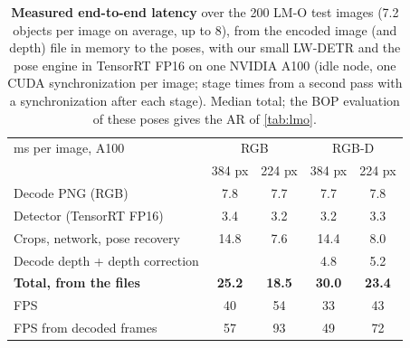\begin{table}[t]
  \centering
  \setlength{\tabcolsep}{3pt}
  \small
  \begin{tabular}{lcccc}
    \toprule
    ms per image, A100 & \multicolumn{2}{c}{RGB} & \multicolumn{2}{c}{RGB-D} \\
    & 384 px & 224 px & 384 px & 224 px \\
    \midrule
    Decode PNG (RGB) & 7.8 & 7.7 & 7.7 & 7.8 \\
    Detector (TensorRT FP16) & 3.4 & 3.2 & 3.2 & 3.3 \\
    Crops, network, pose recovery & 14.8 & 7.6 & 14.4 & 8.0 \\
    Decode depth + depth correction & & & 4.8 & 5.2 \\
    \midrule
    \textbf{Total, from the files} & \textbf{25.2} & \textbf{18.5} & \textbf{30.0} & \textbf{23.4} \\
    FPS & 40 & 54 & 33 & 43 \\
    FPS from decoded frames & 57 & 93 & 49 & 72 \\
    \bottomrule
  \end{tabular}
  \caption{\textbf{Measured end-to-end latency} over the 200 LM-O test images (7.2 objects per
  image on average, up to 8), from the encoded image (and depth) file in memory to the poses,
  with our small LW-DETR and the pose engine in TensorRT FP16 on one NVIDIA A100 (idle node,
  one CUDA synchronization per image; stage times from a second pass with a synchronization
  after each stage). Median total; the BOP evaluation of these poses gives the AR of
  \cref{tab:lmo}.}
  \label{tab:e2e}
\end{table}

